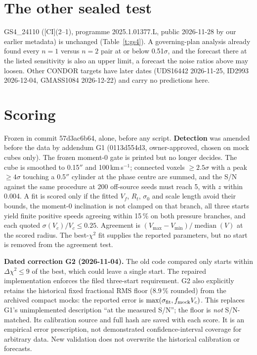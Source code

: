 \documentclass[10pt]{article}
\begin{document}
\section{The other sealed test}
GS4\_24110 ([CI](2--1), programme 2025.1.01377.L, public 2026-11-28 by our earlier metadata) is unchanged (Table~\ref{t:gs4}). A governing-plan analysis already found every $n=1$ versus $n=2$ pair at or below 0.51$\sigma$, and the forecast there at the listed sensitivity is also an upper limit, a forecast the noise ratios above may loosen. Other CONDOR targets have later dates (UDS16442 2026-11-25, ID2993 2026-12-04, GMASS1084 2026-12-22) and carry no predictions here.



\section{Scoring}\label{s:score}
Frozen in commit 57d3ac6b64, alone, before any script. \textbf{Detection} was amended before the data by addendum G1 (0113d554d3, owner-approved, chosen on mock cubes only). The frozen moment-0 gate is printed but no longer decides. The cube is smoothed to 0.15$''$ and 100\,km\,s$^{-1}$; connected voxels $\ge2.5\sigma$ with a peak $\ge4\sigma$ touching a 0.5$''$ cylinder at the phase centre are summed, and the S/N against the same procedure at 200 off-source seeds must reach 5, with $z$ within 0.004. A fit is scored only if the fitted $V_f$, $R_t$, $\sigma_0$ and scale length avoid their bounds, the moment-0 inclination is not clamped on that branch, all three starts yield finite positive speeds agreeing within 15\,\% on both pressure branches, and each quoted $\sigma(V_c)/V_c\le0.25$. Agreement is $(V_{\max}-V_{\min})/\operatorname{median}(V)$ at the scored radius. The best-$\chi^2$ fit supplies the reported parameters, but no start is removed from the agreement test.

\textbf{Dated correction G2 (2026-11-04).} The old code compared only starts within $\Delta\chi^2\le9$ of the best, which could leave a single start. The repaired implementation enforces the filed three-start requirement. G2 also explicitly retains the historical fixed fractional RMS floor (8.9\,\% rounded) from the archived compact mocks: the reported error is $\max(\sigma_{\rm fit},f_{\rm mock}V_c)$. This replaces G1's unimplemented description ``at the measured S/N''; the floor is \emph{not} S/N-matched. Its calibration source and full hash are saved with each score. It is an empirical error prescription, not demonstrated confidence-interval coverage for arbitrary data. New validation does not overwrite the historical calibration or forecasts.
\end{document}
